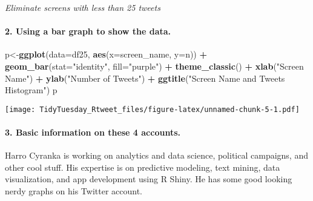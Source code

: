 \documentclass[]{article}
\newenvironment{Shaded}{\begin{snugshade}}{\end{snugshade}}
\newcommand{\CommentTok}[1]{\textcolor[rgb]{0.56,0.35,0.01}{\textit{#1}}}
\newcommand{\DataTypeTok}[1]{\textcolor[rgb]{0.13,0.29,0.53}{#1}}
\newcommand{\DecValTok}[1]{\textcolor[rgb]{0.00,0.00,0.81}{#1}}
\newcommand{\KeywordTok}[1]{\textcolor[rgb]{0.13,0.29,0.53}{\textbf{#1}}}
\newcommand{\NormalTok}[1]{#1}
\newcommand{\OperatorTok}[1]{\textcolor[rgb]{0.81,0.36,0.00}{\textbf{#1}}}
\newcommand{\StringTok}[1]{\textcolor[rgb]{0.31,0.60,0.02}{#1}}
\let\oldparagraph\paragraph
\renewcommand{\paragraph}[1]{\oldparagraph{#1}\mbox{}}
\begin{document}
\emph{Eliminate screens with less than 25 tweets}

\begin{Shaded}
\end{Shaded}

\hypertarget{using-a-bar-graph-to-show-the-data.}{%
\paragraph{2. Using a bar graph to show the
data.}\label{using-a-bar-graph-to-show-the-data.}}

\begin{Shaded}
\begin{Highlighting}[]
\NormalTok{p<-}\KeywordTok{ggplot}\NormalTok{(}\DataTypeTok{data=}\NormalTok{df25, }\KeywordTok{aes}\NormalTok{(}\DataTypeTok{x=}\NormalTok{screen_name, }\DataTypeTok{y=}\NormalTok{n)) }\OperatorTok{+}
\StringTok{  }\KeywordTok{geom_bar}\NormalTok{(}\DataTypeTok{stat=}\StringTok{"identity"}\NormalTok{, }\DataTypeTok{fill=}\StringTok{"purple"}\NormalTok{) }\OperatorTok{+}\StringTok{ }\KeywordTok{theme_classic}\NormalTok{() }\OperatorTok{+}\StringTok{ }\KeywordTok{xlab}\NormalTok{(}\StringTok{"Screen Name"}\NormalTok{) }\OperatorTok{+}\StringTok{ }\KeywordTok{ylab}\NormalTok{(}\StringTok{"Number of Tweets"}\NormalTok{) }\OperatorTok{+}
\StringTok{    }\KeywordTok{ggtitle}\NormalTok{(}\StringTok{"Screen Name and Tweets Histogram"}\NormalTok{)}
\NormalTok{p }
\end{Highlighting}
\end{Shaded}

\texttt{[image: TidyTuesday\_Rtweet\_files/figure-latex/unnamed-chunk-5-1.pdf]}

\hypertarget{basic-information-on-these-4-accounts.}{%
\paragraph{3. Basic information on these 4
accounts.}\label{basic-information-on-these-4-accounts.}}

Harro Cyranka is working on analytics and data science, political
campaigns, and other cool stuff. His expertise is on predictive
modeling, text mining, data visualization, and app development using R
Shiny. He has some good looking nerdy graphs on his Twitter account.
\end{document}
